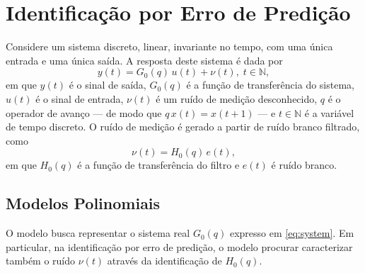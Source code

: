 \documentclass{ppgeesa}
\newcommand{\Prod}{\,}
\begin{document}
\section{Identificação por Erro de Predição}

Considere um sistema discreto, linear, invariante no tempo, com uma única entrada e uma única saída.
A resposta deste sistema é dada por
\begin{equation}\label{eq:system}
  y(t) = G_0(q) \Prod u(t) + \nu(t)
  ,\; t \in \mathbb{N}
  ,
\end{equation}
em que
$y(t)$ é o sinal de saída,
$G_0(q)$ é a função de transferência do sistema,
$u(t)$ é o sinal de entrada,
$\nu(t)$ é um ruído de medição desconhecido, %
$q$ é o operador de avanço --- de modo que $q \Prod x(t) = x(t+1)$ --- e
$t \in \mathbb{N}$ é a variável de tempo discreto.
O ruído de medição é gerado a partir de ruído branco filtrado, como
\begin{equation}
  \nu(t) = H_0(q) \Prod e(t)
  ,
\end{equation}
em que
$H_0(q)$ é a função de transferência do filtro e
$e(t)$ é ruído branco.

\subsection{Modelos Polinomiais}

O modelo busca representar o sistema real $G_0(q)$ expresso em \eqref{eq:system}.
Em particular, na identificação por erro de predição, o modelo procurar caracterizar também o ruído $\nu(t)$ através da identificação de $H_0(q)$.
\end{document}
